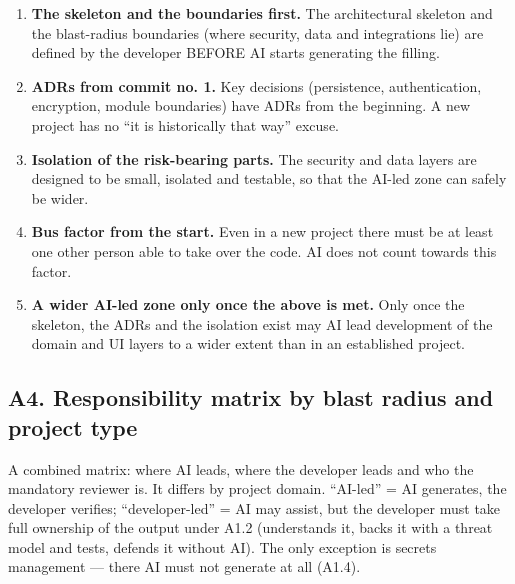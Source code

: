 \begin{enumerate}[label=\textbf{A3.\arabic*}]
\item \textbf{The skeleton and the boundaries first.}
The architectural skeleton and the blast-radius boundaries (where security, data and integrations lie) are defined by the developer BEFORE AI starts generating the filling.
\item \textbf{ADRs from commit no. 1.}
Key decisions (persistence, authentication, encryption, module boundaries) have ADRs from the beginning.
A new project has no \enquote{it is historically that way} excuse.
\item \textbf{Isolation of the risk-bearing parts.}
The security and data layers are designed to be small, isolated and testable, so that the AI-led zone can safely be wider.
\item \textbf{Bus factor from the start.}
Even in a new project there must be at least one other person able to take over the code.
AI does not count towards this factor.
\item \textbf{A wider AI-led zone only once the above is met.}
Only once the skeleton, the ADRs and the isolation exist may AI lead development of the domain and UI layers to a wider extent than in an established project.
\end{enumerate}

\subsection{A4. Responsibility matrix by blast radius and project type}

A combined matrix: where AI leads, where the developer leads and who the mandatory reviewer is.
It differs by project domain.
\enquote{AI-led} = AI generates, the developer verifies; \enquote{developer-led} = AI may assist, but the developer must take full ownership of the output under A1.2 (understands it, backs it with a threat model and tests, defends it without AI).
The only exception is secrets management --- there AI must not generate at all (A1.4).

